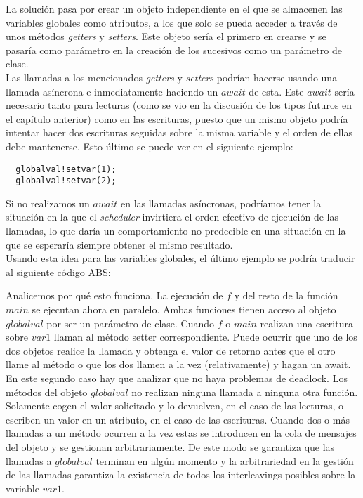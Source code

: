 La solución pasa por crear un objeto independiente en el que se almacenen las variables globales como atributos, a los que solo se pueda acceder a través de unos métodos \emph{getters} y \emph{setters}. Este objeto sería el primero en crearse y se pasaría como parámetro en la creación de los sucesivos como un parámetro de clase.\\

Las llamadas a los mencionados \emph{getters} y \emph{setters} podrían hacerse usando una llamada asíncrona e inmediatamente haciendo un $await$ de esta. Este $await$ sería necesario tanto para lecturas (como se vio en la discusión de los tipos futuros en el capítulo anterior) como en las escrituras, puesto que un mismo objeto podría intentar hacer dos escrituras seguidas sobre la misma variable y el orden de ellas debe mantenerse. Esto último se puede ver en el siguiente ejemplo:
\begin{lstlisting}
  globalval!setvar(1);
  globalval!setvar(2);
\end{lstlisting}

Si no realizamos un $await$ en las llamadas asíncronas, podríamos tener la situación en la que el \emph{scheduler} invirtiera el orden efectivo de ejecución de las llamadas, lo que daría un comportamiento no predecible en una situación en la que se esperaría siempre obtener el mismo resultado.\\

Usando esta idea para las variables globales, el último ejemplo se podría traducir al siguiente código ABS:



Analicemos por qué esto funciona. La ejecución de $f$ y del resto de la función $main$ se ejecutan ahora en paralelo. Ambas funciones tienen acceso al objeto $globalval$ por ser un parámetro de clase. Cuando $f$ o $main$ realizan una escritura sobre $var1$ llaman al método setter correspondiente. Puede ocurrir que uno de los dos objetos realice la llamada y obtenga el valor de retorno antes que el otro llame al método o que los dos llamen a la vez (relativamente) y hagan un await.\\

En este segundo caso hay que analizar que no haya problemas de deadlock. Los métodos del objeto $globalval$ no realizan ninguna llamada a ninguna otra función. Solamente cogen el valor solicitado y lo devuelven, en el caso de las lecturas, o escriben un valor en un atributo, en el caso de las escrituras. Cuando dos o más llamadas a un método ocurren a la vez estas se introducen en la cola de mensajes del objeto y se gestionan arbitrariamente. De este modo se garantiza que las llamadas a $globalval$ terminan en algún momento y la arbitrariedad en la gestión de las llamadas garantiza la existencia de todos los interleavings posibles sobre la variable $var1$.\\

